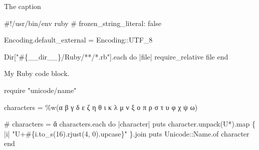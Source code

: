 \documentclass[
  12pt,
  a4paper,
  oneside,
  numbers=noenddot,
  titlepage,
  toclink=all,
  toc=bibliography]{scrbook}
\newenvironment{Shaded}{\begin{snugshade}}{\end{snugshade}}
\newcommand{\AttributeTok}[1]{\textcolor[rgb]{0.40,0.45,0.13}{#1}}
\newcommand{\CharTok}[1]{\textcolor[rgb]{0.13,0.47,0.30}{#1}}
\newcommand{\CommentTok}[1]{\textcolor[rgb]{0.37,0.37,0.37}{#1}}
\newcommand{\ControlFlowTok}[1]{\textcolor[rgb]{0.00,0.23,0.31}{#1}}
\newcommand{\DataTypeTok}[1]{\textcolor[rgb]{0.68,0.00,0.00}{#1}}
\newcommand{\DecValTok}[1]{\textcolor[rgb]{0.68,0.00,0.00}{#1}}
\newcommand{\FunctionTok}[1]{\textcolor[rgb]{0.28,0.35,0.67}{#1}}
\newcommand{\KeywordTok}[1]{\textcolor[rgb]{0.00,0.23,0.31}{#1}}
\newcommand{\NormalTok}[1]{\textcolor[rgb]{0.00,0.23,0.31}{#1}}
\newcommand{\OtherTok}[1]{\textcolor[rgb]{0.00,0.23,0.31}{#1}}
\newcommand{\SpecialCharTok}[1]{\textcolor[rgb]{0.37,0.37,0.37}{#1}}
\newcommand{\StringTok}[1]{\textcolor[rgb]{0.13,0.47,0.30}{#1}}
\newcommand{\VerbatimStringTok}[1]{\textcolor[rgb]{0.13,0.47,0.30}{#1}}
\theoremstyle{definition}
\theoremstyle{definition}
\theoremstyle{definition}
\theoremstyle{plain}
\theoremstyle{plain}
\theoremstyle{plain}
\theoremstyle{plain}
\theoremstyle{plain}
\theoremstyle{remark}
\begin{document}
\begin{codelisting}

\caption{The caption}

\hypertarget{lst-scriv27}{%
\label{lst-scriv27}}%
\begin{Shaded}
\begin{Highlighting}[numbers=left,,]

\ControlFlowTok{\#!/usr/bin/env ruby}
\CommentTok{\# frozen\_string\_literal: false}

\DataTypeTok{Encoding}\AttributeTok{.default\_external} \KeywordTok{=} \DataTypeTok{Encoding}\KeywordTok{::}\DataTypeTok{UTF\_8}

\DataTypeTok{Dir}\KeywordTok{[}\StringTok{"}\SpecialCharTok{\#\{}\NormalTok{\_\_dir\_\_}\SpecialCharTok{\}}\StringTok{/Ruby/**/*.rb"}\KeywordTok{]}\AttributeTok{.each} \ControlFlowTok{do} \KeywordTok{|}\NormalTok{file}\KeywordTok{|}
  \FunctionTok{require\_relative}\NormalTok{ file}
\ControlFlowTok{end}
\end{Highlighting}
\end{Shaded}

\end{codelisting}

\begin{codelisting}

\caption{My Ruby code block.}

\hypertarget{lst-scriv28}{%
\label{lst-scriv28}}%
\begin{Shaded}
\begin{Highlighting}[numbers=left,,]
\FunctionTok{require} \StringTok{"unicode/name"}

\NormalTok{characters }\KeywordTok{=}\OtherTok{ \%w(}\StringTok{α β γ δ ε ζ η θ ι κ λ μ ν ξ ο π ρ σ τ υ φ χ ψ ω}\OtherTok{)}

\CommentTok{\# characters = \textquotesingle{}ἄ\textquotesingle{}}
\NormalTok{characters}\AttributeTok{.each} \ControlFlowTok{do} \KeywordTok{|}\NormalTok{character}\KeywordTok{|}
  \FunctionTok{puts}\NormalTok{ character}\AttributeTok{.unpack}\NormalTok{(}\VerbatimStringTok{\textquotesingle{}U*\textquotesingle{}}\NormalTok{)}\AttributeTok{.map} \KeywordTok{\{} \KeywordTok{|}\NormalTok{i}\KeywordTok{|} 
    \StringTok{"U+}\SpecialCharTok{\#\{}\NormalTok{i}\AttributeTok{.to\_s}\NormalTok{(}\DecValTok{16}\NormalTok{)}\AttributeTok{.rjust}\NormalTok{(}\DecValTok{4}\NormalTok{, }\CharTok{\textquotesingle{}0\textquotesingle{}}\NormalTok{)}\AttributeTok{.upcase}\SpecialCharTok{\}}\StringTok{"}
  \KeywordTok{\}}\AttributeTok{.join}
  \FunctionTok{puts} \DataTypeTok{Unicode}\KeywordTok{::}\DataTypeTok{Name}\AttributeTok{.of}\NormalTok{ character}
\ControlFlowTok{end}
\end{Highlighting}
\end{Shaded}

\end{codelisting}
\end{document}
